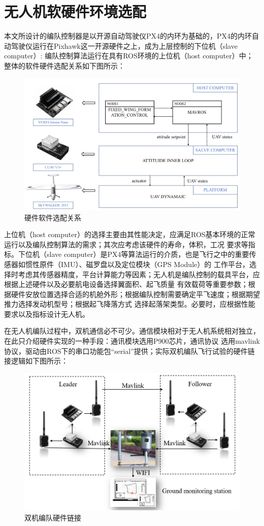\section{无人机软硬件环境选配}
本文所设计的编队控制器是以开源自动驾驶仪PX4的内环为基础的，PX4的内环自动驾驶仪运行在Pixhawk这一开源硬件之上，成为上层控制的下位机（slave computer）:
编队控制算法运行在具有ROS环境的上位机（host computer）中；
整体的软件硬件选配关系如下图所示：
\begin{figure}[H]
    \centering
    \includegraphics[width=1\textwidth]{figures/c4/c4-soft-hard.png}
    \caption{硬件软件选配关系}\label{fig:c4-soft-hard.png}
\end{figure}
上位机（host computer）的选择主要由其性能决定，应满足ROS基本环境的正常运行以及编队控制算法的需求；其次应考虑该硬件的寿命，体积，工况
要求等指标。下位机（slave computer）是PX4等算法运行的介质，也是飞行之中的重要传感器如惯性原件（IMU）、磁罗盘以及定位模块（GPS Module）的
工作平台，选择时考虑其传感器精度，平台计算能力等因素；无人机是编队控制的载具平台，应根据上述硬件以及必要航电设备选择翼面积、起飞质量
有效载荷等重要参数；根据硬件安放位置选择合适的机舱外形；根据编队控制需要确定平飞速度；根据期望推力选择发动机型号；根据起飞降落方式
选择起落架类型。必要时，应根据性能要求以及指标设计无人机。

在无人机编队过程中，双机通信必不可少。通信模块相对于无人机系统相对独立，在此只介绍硬件实现的一种手段：通讯模块选用P900芯片，通讯协议
选用mavlink协议，驱动由ROS下的串口功能包“serial”提供；实际双机编队飞行试验的硬件链接逻辑如下图所示：
\begin{figure}[H]
    \centering
    \includegraphics[width=1\textwidth]{figures/c4/double_plane_real}
    \caption{双机编队硬件链接}\label{fig:c4-double_plane_real}
\end{figure}
